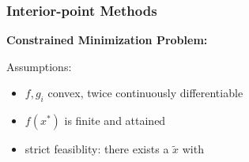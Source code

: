 \documentclass[8pt,a4paper]{scrartcl}
\begin{document}
\begin{multicols*}{3}
%
%
%
%
%
%
%
%
%
%
%
%
%
%
%
%

\subsubsection{Interior-point Methods}

\textbf{Constrained Minimization Problem:}


Assumptions:

\begin{itemize}
\ncompaq
\item $f,g_i$ convex, twice continuously differentiable
\item $f(x^\ast)$ is finite and attained
\item strict feasiblity: there exists a $\tilde{x}$ with 


\end{itemize}
\end{multicols*}
\end{document}
